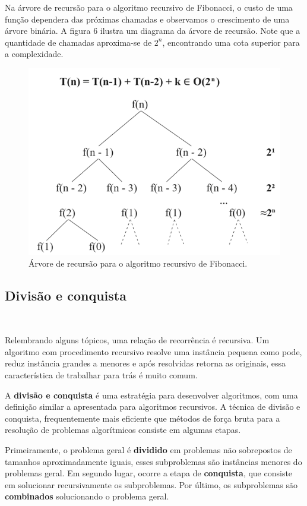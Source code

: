 Na árvore de recursão para o algoritmo recursivo de Fibonacci, o custo de uma função dependera das próximas chamadas e observamos o crescimento de uma árvore binária. A figura 6 ilustra um diagrama da árvore de recursão. Note que a quantidade de chamadas aproxima-se de $2^n$, encontrando uma cota superior para a complexidade.

\begin{figure}[h]
  \centering
  \includegraphics[width=0.7\linewidth]{img/arvorerecursaofib.png}
    \caption{Árvore de recursão para o algoritmo recursivo de Fibonacci.}
    \label{arvorerecursaofib}
\end{figure}

\subsection{Divisão e conquista}
\

Relembrando alguns tópicos, uma relação de recorrência é recursiva. Um algoritmo com procedimento recursivo resolve uma instância pequena como pode, reduz instância grandes a menores e após resolvidas retorna as originais, essa característica de trabalhar para trás é muito comum.

A \textbf{divisão e conquista} é uma estratégia para desenvolver algoritmos, com uma definição similar a apresentada para algoritmos recursivos. A técnica de divisão e conquista, frequentemente mais eficiente que métodos de força bruta para a resolução de problemas algorítmicos consiste em algumas etapas.

Primeiramente, o problema geral é \textbf{dividido} em problemas não sobrepostos de tamanhos aproximadamente iguais, esses subproblemas são instâncias menores do problemas geral. Em segundo lugar, ocorre a etapa de \textbf{conquista}, que consiste em solucionar recursivamente os subproblemas. Por último, os subproblemas são \textbf{combinados} solucionando o problema geral.

